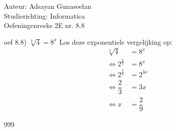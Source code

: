 \documentclass[a4paper]{article}
\begin{document}
\noindent \large Auteur: Adsayan Gunaseelan \\
\noindent \large Studierichting: Informatica\\
\noindent \large Oefeningenreeks 2E nr. 8.8\\

\medskip

\normalsize
oef 8.8) $\sqrt[3]{4} = 8^x$ Los deze exponentiele vergelijking op:\\
\begin{align*}
\sqrt[3]{4} &= 8^x \\
\Leftrightarrow 2^{\tfrac{2}{3}} &= 8^x \\
\Leftrightarrow 2^{\tfrac{2}{3}} &= 2^{3x} \\
\Leftrightarrow \dfrac{2}{3} &= 3x \\
\Leftrightarrow x &= \dfrac{2}{9}
\end{align*}

\begin{thebibliography}{999}
\end{thebibliography}
\end{document}
